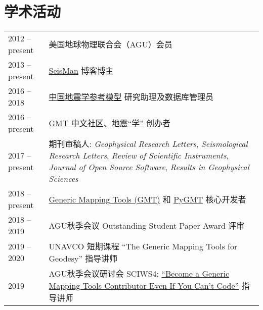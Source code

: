 \section*{学术活动}

\newcommand{\tabitem}{~~\llap{\textbullet}~~}

\begin{tabular}{p{} p{}}
2012 -- present & 美国地球物理联合会（AGU）会员 \\
2013 -- present & \href{https://blog.seisman.info}{SeisMan} 博客博主 \\
2016 -- 2018    & \href{http://chinageorefmodel.org/}{中国地震学参考模型} 研究助理及数据库管理员 \\
2016 -- present & \href{http://gmt-china.org/}{GMT 中文社区}、\href{https://seismo-learn.org/}{地震``学''} 创办者 \\
2017 -- present & 期刊审稿人:
                  \textit{Geophysical Research Letters},
                  \textit{Seismological Research Letters},
                  \textit{Review of Scientific Instruments},
                  \textit{Journal of Open Source Software},
                  \textit{Results in Geophysical Sciences} \\
2018 -- present & \href{https://github.com/GenericMappingTools/gmt}{Generic Mapping Tools (GMT)} 和 \href{https://github.com/GenericMappingTools/pygmt}{PyGMT} 核心开发者 \\
2018 -- 2019 & AGU秋季会议 Outstanding Student Paper Award 评审 \\
2019 -- 2020 & UNAVCO 短期课程 ``The Generic Mapping Tools for Geodesy'' 指导讲师 \\
2019 & AGU秋季会议研讨会 SCIWS4: \href{https://www.agu.org/Events/SCIWS4-Generic-Mapping-Tools}{``Become a Generic Mapping Tools Contributor Even If You Can't Code''} 指导讲师 \\
\end{tabular}

